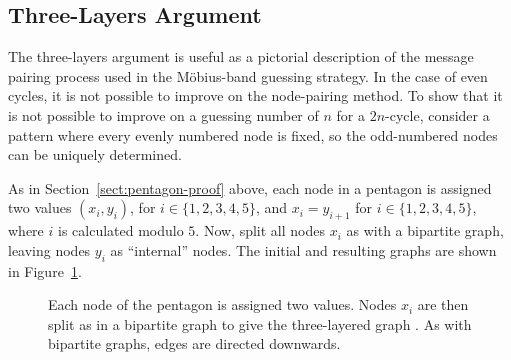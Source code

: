 \subsection{Three-Layers Argument}

The three-layers argument is useful as a pictorial description of the message pairing process used in the M{\"o}bius-band guessing strategy. In the case of even cycles, it is not possible to improve on the node-pairing method. To show that it is not possible to improve on a guessing number of $n$ for a $2n$-cycle, consider a pattern where every evenly numbered node is fixed, so the odd-numbered nodes can be uniquely determined.

As in Section~\ref{sect:pentagon-proof} above, each node in a pentagon is assigned two values $(x_i, y_i)$, for $i \in \{1, 2, 3, 4, 5\}$, and $x_i = y_{i + 1}$ for $i \in \{1, 2, 3, 4, 5\}$, where $i$ is calculated modulo $5$. Now, split all nodes $x_i$ as with a bipartite graph, leaving nodes $y_i$ as ``internal'' nodes. The initial and resulting graphs are shown in Figure~\ref{fig:3layers}.

\begin{figure}[ht]
     \centering
     \hspace{.3in}
     \caption[Three-layers argument before and after conversion]{Each node of the pentagon  is assigned two values. Nodes $x_i$ are then split as in a bipartite graph to give the three-layered graph . As with bipartite graphs, edges are directed downwards.}
     \label{fig:3layers}
\end{figure}

